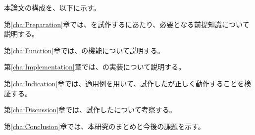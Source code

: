 本論文の構成を、以下に示す。

第\ref{cha:Preparation}章では、\tool{}を試作するにあたり、必要となる前提知識について説明する。

第\ref{cha:Function}章では、\tool{}の機能について説明する。

第\ref{cha:Implementation}章では、\tool{}の実装について説明する。

第\ref{cha:Indication}章では、適用例を用いて、試作した\tool{}が正しく動作することを検証する。

第\ref{cha:Discussion}章では、試作した\tool{}について考察する。

第\ref{cha:Conclusion}章では、本研究のまとめと今後の課題を示す。
